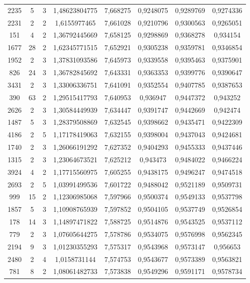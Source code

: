 \begin{longtable}{|c|c|c|c|c|c|c|c|}
2235 & 5 & 3 & 1,48623804775 & 7,668275 & 0,9248075 & 0,9289769 & 0,9274336 \\
2231 & 2 & 2 & 1,6155977465 & 7,661028 & 0,9210796 & 0,9300563 & 0,9265051 \\
151 & 4 & 2 & 1,36792445669 & 7,658125 & 0,9298869 & 0,9368278 & 0,934154 \\
1677 & 28 & 2 & 1,62345771515 & 7,652921 & 0,9305238 & 0,9359781 & 0,9346854 \\
1952 & 2 & 3 & 1,37831093586 & 7,645973 & 0,9339558 & 0,9395463 & 0,9375901 \\
826 & 24 & 3 & 1,36782845692 & 7,643331 & 0,9363353 & 0,9399776 & 0,9390647 \\
3431 & 2 & 3 & 1,33006336751 & 7,641091 & 0,9352554 & 0,9407785 & 0,9387653 \\
390 & 63 & 2 & 1,29515417793 & 7,640953 & 0,936947 & 0,9447372 & 0,943252 \\
2626 & 2 & 3 & 1,30584449939 & 7,634447 & 0,9391747 & 0,9442669 & 0,942474 \\
1487 & 5 & 3 & 1,28379508869 & 7,632545 & 0,9398662 & 0,9435471 & 0,9422309 \\
4186 & 2 & 5 & 1,17178419063 & 7,632155 & 0,9398004 & 0,9437043 & 0,9424681 \\
1740 & 2 & 3 & 1,26066191292 & 7,627352 & 0,9404293 & 0,9455333 & 0,9437446 \\
1315 & 2 & 3 & 1,23064673521 & 7,625212 & 0,943473 & 0,9484022 & 0,9466224 \\
3924 & 4 & 2 & 1,17715560975 & 7,605255 & 0,9438175 & 0,9496247 & 0,9474518 \\
2693 & 2 & 5 & 1,03991499536 & 7,601722 & 0,9488042 & 0,9521189 & 0,9509731 \\
999 & 15 & 2 & 1,12306985068 & 7,597966 & 0,9500374 & 0,9549133 & 0,9537798 \\
1857 & 5 & 3 & 1,10908765939 & 7,597852 & 0,9504105 & 0,9537749 & 0,9526854 \\
178 & 14 & 3 & 1,14897471822 & 7,588725 & 0,9514876 & 0,9543525 & 0,9537112 \\
779 & 2 & 3 & 1,07605644275 & 7,578786 & 0,9534075 & 0,9576998 & 0,9562345 \\
2194 & 9 & 3 & 1,01230355293 & 7,575317 & 0,9543968 & 0,9573147 & 0,956653 \\
2480 & 2 & 4 & 1,0158731144 & 7,574753 & 0,9543677 & 0,9573389 & 0,9563821 \\
781 & 8 & 2 & 1,08061482733 & 7,573838 & 0,9549296 & 0,9591171 & 0,9578734 \\

\end{longtable}
